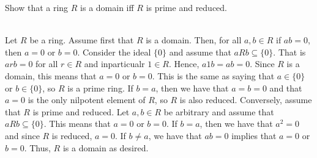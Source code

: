 Show that a ring $R$ is a domain iff $R$ is prime and reduced.\\

\begin{solution}\renewcommand{\qedsymbol}{}\ \\
    Let $R$ be a ring. Assume first that $R$ is a domain. Then, for all $a,b\in R$ if $ab=0$, then $a=0$
    or $b=0$. Consider the ideal $\{0\}$ and assume that $aRb\subseteq\{0\}$. That is $arb=0$ for all
    $r\in R$ and inparticualr $1\in R$. Hence, $a1b=ab=0$. Since $R$ is a domain, this means that $a=0$
    or $b=0$. This is the same as saying that $a\in\{0\}$ or $b\in\{0\}$, so $R$ is a prime ring. If
    $b=a$, then we have that $a=b=0$ and that $a=0$ is the only nilpotent element of $R$, so $R$ is also
    reduced.  Conversely, assume that $R$ is prime and reduced. Let $a,b\in R$ be arbitrary and assume
    that $aRb\subseteq\{0\}$. This means that $a=0$ or $b=0$. If $b=a$, then we have that $a^2=0$ and
    since $R$ is reduced, $a=0$. If $b\neq a$, we have that $ab=0$ implies that $a=0$ or $b=0$. Thus,
    $R$ is a domain as desired. 

\end{solution}